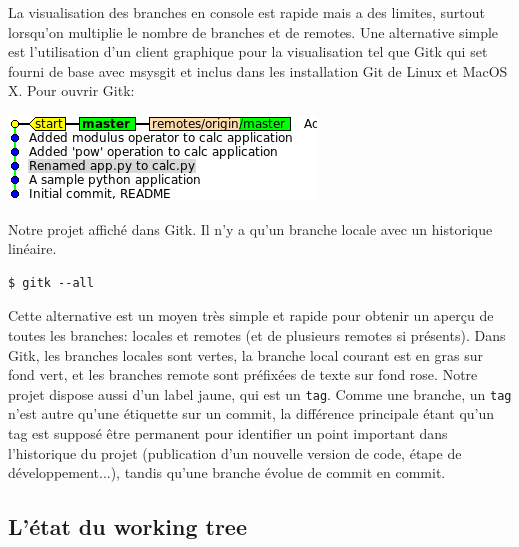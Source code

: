 \documentclass{../../common/tufte-latex/tufte-handout}
\begin{document}
La visualisation des branches en console est rapide mais a des limites, surtout lorsqu'on multiplie le nombre de branches et de remotes.
Une alternative simple est l'utilisation d'un client graphique pour la visualisation tel que Gitk qui set fourni de base avec msysgit et inclus dans les installation Git de Linux et MacOS X.
Pour ouvrir Gitk:

\begin{marginfigure}%
  \centering
  \includegraphics[width=\linewidth]{gitk-start.png}
  \label{fig:gitk-start}
  \caption{Notre projet affiché dans Gitk. Il n'y a qu'un branche locale avec un historique linéaire.}
\end{marginfigure}

\begin{lstlisting}[style=BashInputStyle]
  $ gitk --all
\end{lstlisting}

Cette alternative est un moyen très simple et rapide pour obtenir un aperçu de toutes les branches: locales et remotes (et de plusieurs remotes si présents).
Dans Gitk, les branches locales sont vertes, la branche local courant est en gras sur fond vert, et les branches remote sont préfixées de texte sur fond rose.
Notre projet dispose aussi d'un label jaune, qui est un \texttt{tag}.
Comme une branche, un \texttt{tag} n'est autre qu'une étiquette sur un commit, la différence principale étant qu'un tag est supposé être permanent pour identifier un point important dans l'historique du projet (publication d'un nouvelle version de code, étape de développement...), tandis qu'une branche évolue de commit en commit.

\subsection{L'état du working tree}
\end{document}
